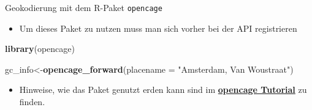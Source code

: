 \documentclass[ignorenonframetext,]{beamer}
\newenvironment{Shaded}{\begin{snugshade}}{\end{snugshade}}
\newcommand{\KeywordTok}[1]{\textcolor[rgb]{0.13,0.29,0.53}{\textbf{#1}}}
\newcommand{\DataTypeTok}[1]{\textcolor[rgb]{0.13,0.29,0.53}{#1}}
\newcommand{\StringTok}[1]{\textcolor[rgb]{0.31,0.60,0.02}{#1}}
\newcommand{\NormalTok}[1]{#1}
\providecommand{\tightlist}{%
  \setlength{\itemsep}{0pt}\setlength{\parskip}{0pt}}
\begin{document}
\begin{frame}[fragile]{Geokodierung mit dem R-Paket \texttt{opencage}}

\begin{itemize}
\tightlist
\item
  Um dieses Paket zu nutzen muss man sich vorher bei der API
  registrieren
\end{itemize}

\begin{Shaded}
\begin{Highlighting}[]
\KeywordTok{library}\NormalTok{(opencage)}
\end{Highlighting}
\end{Shaded}

\begin{Shaded}
\begin{Highlighting}[]
\NormalTok{gc_info<-}\KeywordTok{opencage_forward}\NormalTok{(}\DataTypeTok{placename =} 
                              \StringTok{"Amsterdam, Van Woustraat"}\NormalTok{)}
\end{Highlighting}
\end{Shaded}

\begin{itemize}
\tightlist
\item
  Hinweise, wie das Paket genutzt erden kann sind im
  \href{https://ropensci.org/tutorials/opencage_tutorial/}{\textbf{opencage
  Tutorial}} zu finden.
\end{itemize}

\end{frame}
\end{document}
